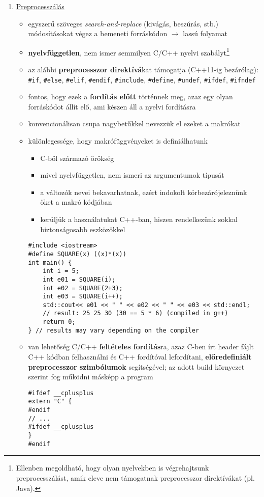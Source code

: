 \documentclass[a4paper, 11pt, oneside]{book}
\begin{document}
\begin{enumerate}[label=\Roman{*}.)]
	\item \underline{Preprocesszálás}
	
	\begin{itemize}
		\item egyszerű szöveges \textit{search-and-replace} (kivágás, beszúrás, stb.) módosításokat végez a bemeneti forráskódon $\to$ lassú folyamat
		\item \textbf{nyelvfüggetlen}, nem ismer semmilyen C/C++ nyelvi szabályt\footnote{Ellenben megoldható, hogy olyan nyelvekben is végrehajtsunk preprocesszálást, amik eleve nem támogatnak preprocesszor direktívákat (pl. Java).}
		
		\item az alábbi \textbf{preprocesszor direktívá}kat támogatja (C++11-ig bezárólag): \verb|#if|, \verb|#else|, \verb|#elif|, \verb|#endif|, \verb|#include|, \verb|#define|, \verb*|#undef|, \verb|#ifdef|, \verb|#ifndef|
		\item fontos, hogy ezek a \textbf{fordítás előtt} történnek meg, azaz egy olyan forráskódot állít elő, ami készen áll a nyelvi fordításra
		\item konvencionálisan csupa nagybetűkkel nevezzük el ezeket a makrókat
		\item különlegessége, hogy makrófüggvényeket is definiálhatunk
		\begin{itemize}
			\item C-ből származó örökség
			\item mivel nyelvfüggetlen, nem ismeri az argumentumok típusát
			\item a változók nevei bekavarhatnak, ezért indokolt körbezárójeleznünk őket a makró kódjában
			\item kerüljük a használatukat C++-ban, hiszen rendelkezünk sokkal biztonságosabb eszközökkel
		\end{itemize}

\begin{lstlisting}[style=cppstyle]
#include <iostream>
#define SQUARE(x) ((x)*(x))	
int main() {	
	int i = 5;
	int e01 = SQUARE(i);
	int e02 = SQUARE(2+3);
	int e03 = SQUARE(i++);
	std::cout<< e01 << " " << e02 << " " << e03 << std::endl;
	// result: 25 25 30 (30 == 5 * 6) (compiled in g++)
	return 0;
} // results may vary depending on the compiler
\end{lstlisting}
		
		\item van lehetőség C/C++ \textbf{feltételes fordítás}ra, azaz C-ben írt header fájlt C++ kódban felhasználni és C++ fordítóval lefordítani, \textbf{előredefiniált preprocesszor szimbólumok} segítségével; az adott build környezet szerint fog működni másképp a program
\begin{lstlisting}[style=cppstyle]
#ifdef __cplusplus
extern "C" {
#endif
// ...
#ifdef __cplusplus
}
#endif
\end{lstlisting}
	\end{itemize}
	

\end{enumerate}
\end{document}
